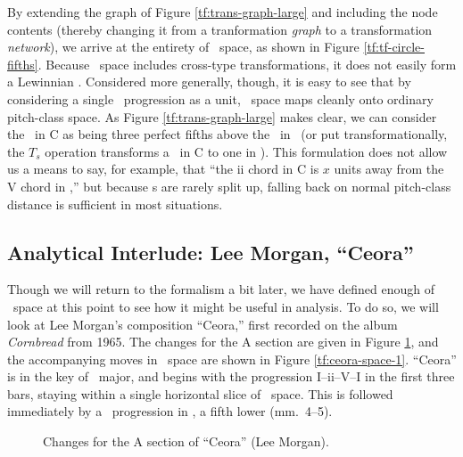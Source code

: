 By extending the graph of Figure \ref{tf:trans-graph-large} and including the
node contents (thereby changing it from a tranformation \emph{graph} to a
transformation \emph{network}), we arrive at the entirety of \tf\ space, as
shown in Figure \ref{tf:tf-circle-fifths}. Because \tf\ space includes
cross-type transformations, it does not easily form a Lewinnian \gis.
Considered more generally, though, it is easy to see that by considering a
single \tfo\ progression as a unit, \tf\ space maps cleanly onto ordinary
pitch-class space.  As Figure \ref{tf:trans-graph-large} makes clear, we can
consider the \tfo\ in C as being three perfect fifths above the \tfo\ in
\Eflat\ (or put transformationally, the $T_s$ operation transforms a \tfo\ in
C to one in \Eflat). This formulation does not allow us a means to say, for
example, that “the ii chord in C is $x$ units away from the V chord in
\Eflat,” but because \tfo{}s are rarely split up, falling back on normal
pitch-class distance is sufficient in most situations.




\FloatBarrier

\subsection{Analytical Interlude: Lee Morgan, “Ceora”}


Though we will return to the formalism a bit later, we have defined enough of
\tf\ space at this point to see how it might be useful in analysis. To do so,
we will look at Lee Morgan's composition ``Ceora,'' first recorded on the
album \emph{Cornbread} from 1965. The changes for the A section are given in
Figure \ref{tf:ceora-changes-1}, and the accompanying moves in \tf\ space are
shown in Figure \ref{tf:ceora-space-1}. ``Ceora'' is in the key of
\Aflat\ major, and begins with the progression I--ii--V--I in the first three
bars, staying within a single horizontal slice of \tf\ space. This is followed
immediately by a \tfo\ progression in \Dflat, a fifth lower (mm.~4--5).

\begin{figure}[thbp]
  \caption{Changes for the A section of ``Ceora'' (Lee Morgan).}
  \label{tf:ceora-changes-1}
\end{figure}

